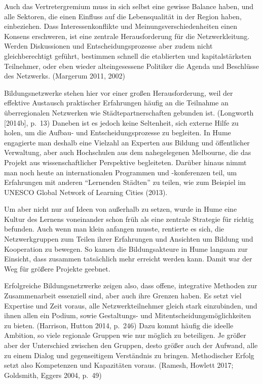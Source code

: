 \documentclass[a4paper,
fontsize=11pt,
oneside,
numbers=noperiodatend,
parskip=half-,
bibliography=totoc,
final
]{scrartcl}
\begin{document}
Auch das Vertretergremium muss in sich selbst eine gewisse Balance
haben, und alle Sektoren, die einen Einfluss auf die Lebensqualität in
der Region haben, einbeziehen. Dass Interessenkonflikte und
Meinungsverschiedenheiten einen Konsens erschweren, ist eine zentrale
Herausforderung für die Netzwerkleitung. Werden Diskussionen und
Entscheidungsprozesse aber zudem nicht gleichberechtigt geführt,
bestimmen schnell die etablierten und kapitalstärksten Teilnehmer, oder
eben wieder alteingesessene Politiker die Agenda und Beschlüsse des
Netzwerks. (Margerum 2011, 2002)

Bildungsnetzwerke stehen hier vor einer großen Herausforderung, weil der
effektive Austausch praktischer Erfahrungen häufig an die Teilnahme an
überregionalen Netzwerken wie Städtepartnerschaften gebunden ist.
(Longworth {[}2014b{]}, p.~13) Daneben ist es jedoch keine Seltenheit,
sich externe Hilfe zu holen, um die Aufbau- und Entscheidungsprozesse zu
begleiten. In Hume engagierte man deshalb eine Vielzahl an Experten aus
Bildung und öffentlicher Verwaltung, aber auch Hochschulen aus dem
nahegelegenen Melbourne, die das Projekt aus wissenschaftlicher
Perspektive begleiteten. Darüber hinaus nimmt man noch heute an
internationalen Programmen und -konferenzen teil, um Erfahrungen mit
anderen \enquote{Lernenden Städten} zu teilen, wie zum Beispiel im
UNESCO Global Network of Learning Cities (2013).

Um aber nicht nur auf Ideen von außerhalb zu setzen, wurde in Hume eine
Kultur des Lernens voneinander schon früh als eine zentrale Strategie
für richtig befunden. Auch wenn man klein anfangen musste, rentierte es
sich, die Netzwerkgruppen zum Teilen ihrer Erfahrungen und Ansichten um
Bildung und Kooperation zu bewegen. So kamen die Bildungsakteure in Hume
langsam zur Einsicht, dass zusammen tatsächlich mehr erreicht werden
kann. Damit war der Weg für größere Projekte geebnet.

Erfolgreiche Bildungsnetzwerke zeigen also, dass offene, integrative
Methoden zur Zusammenarbeit essenziell sind, aber auch ihre Grenzen
haben. Es setzt viel Expertise und Zeit voraus, alle Netzwerkteilnehmer
gleich stark einzubinden, und ihnen allen ein Podium, sowie Gestaltungs-
und Mitentscheidungsmöglichkeiten zu bieten. (Harrison, Hutton 2014,
p.~246) Dazu kommt häufig die ideelle Ambition, so viele regionale
Gruppen wie nur möglich zu beteiligen. Je größer aber der Unterschied
zwischen den Gruppen, desto größer auch der Aufwand, alle zu einem
Dialog und gegenseitigem Verständnis zu bringen. Methodischer Erfolg
setzt also Kompetenzen und Kapazitäten voraus. (Ramesh, Howlett 2017;
Goldsmith, Eggers 2004, p.~49)
\end{document}

